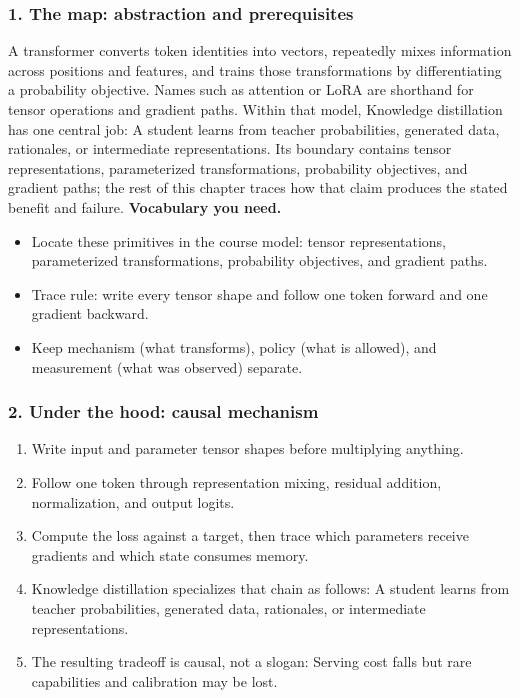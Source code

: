\subsubsection*{1. The map: abstraction and prerequisites}
A transformer converts token identities into vectors, repeatedly mixes information across positions and features, and trains those transformations by differentiating a probability objective. Names such as attention or LoRA are shorthand for tensor operations and gradient paths.
Within that model, Knowledge distillation has one central job: A student learns from teacher probabilities, generated data, rationales, or intermediate representations. Its boundary contains tensor representations, parameterized transformations, probability objectives, and gradient paths; the rest of this chapter traces how that claim produces the stated benefit and failure.
\textbf{Vocabulary you need.}\begin{itemize}
\item Locate these primitives in the course model: tensor representations, parameterized transformations, probability objectives, and gradient paths.
\item Trace rule: write every tensor shape and follow one token forward and one gradient backward.
\item Keep mechanism (what transforms), policy (what is allowed), and measurement (what was observed) separate.
\end{itemize}
\subsubsection*{2. Under the hood: causal mechanism}\begin{enumerate}
\item Write input and parameter tensor shapes before multiplying anything.
\item Follow one token through representation mixing, residual addition, normalization, and output logits.
\item Compute the loss against a target, then trace which parameters receive gradients and which state consumes memory.
\item Knowledge distillation specializes that chain as follows: A student learns from teacher probabilities, generated data, rationales, or intermediate representations.
\item The resulting tradeoff is causal, not a slogan: Serving cost falls but rare capabilities and calibration may be lost.
\end{enumerate}
